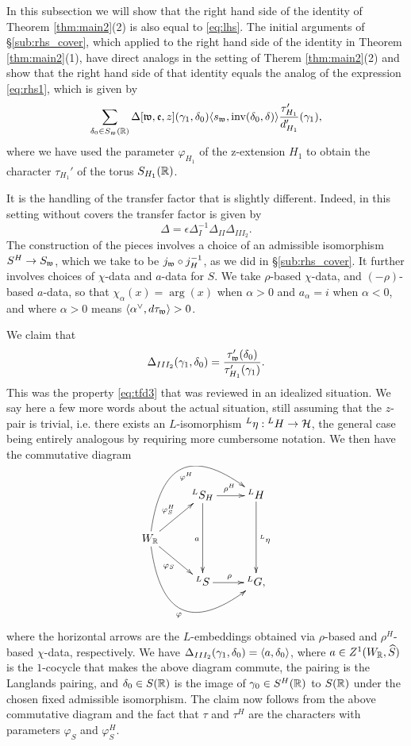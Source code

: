 \documentclass{article}
\theoremstyle{definition}
\numberwithin{equation}{section}
\renewcommand{\-}{\hyp{}}
\begin{document}
In this subsection we will show that the right hand side of the identity of Theorem \ref{thm:main2}(2) is also equal to \eqref{eq:lhs}. The initial arguments of \S\ref{sub:rhs_cover}, which applied to the right hand side of the identity in Theorem \ref{thm:main2}(1), have direct analogs in the setting of Therem \ref{thm:main2}(2) and show that the right hand side of that identity equals the analog of the expression \eqref{eq:rhs1}, which is given by
\begin{equation} \label{eq:rhs2}
\sum_{\delta_0 \in S_{\mathfrak{w}}(\mathbb{R})} \Delta[\mathfrak{w},\mathfrak{e},z](\gamma_1,\delta_0)\langle s_{\mathfrak{w}},\textrm{inv}(\delta_0,\delta)\rangle \frac{\tau'_{H_1}}{d'_{H_1}}(\gamma_1),	
\end{equation}
where we have used the parameter $\varphi_{H_1}$ of the z-extension $H_1$ to obtain the character $\tau_{H_1}'$ of the torus $S_{H_1}(\mathbb{R})$.


It is the handling of the transfer factor that is slightly different. Indeed, in this setting without covers the transfer factor is given by
\[ \Delta = \epsilon\Delta_I^{-1}\Delta_{II}\Delta_{III_2}. \]
The construction of the pieces involves a choice of an admissible isomorphism $S^H \to S_{\mathfrak{w}}$, which we take to be $j_{\mathfrak{w}}\circ j_H^{-1}$, as we did in \S\ref{sub:rhs_cover}. It further involves choices of $\chi$-data and $a$-data for $S$. We take $\rho$-based $\chi$-data, and $(-\rho)$-based $a$-data, so that $\chi_\alpha(x)=\arg(x)$ when $\alpha>0$ and $a_\alpha=i$ when $\alpha<0$, and where $\alpha>0$ means $\langle\alpha^\vee,d\tau_{\mathfrak{w}}\rangle>0$.

We claim that
\[ \Delta_{III_2}(\gamma_1,\delta_0) = \frac{\tau'_{\mathfrak{w}}(\delta_0)}{\tau'_{H_1}(\gamma_1)}.\]
This was the property \eqref{eq:tfd3} that was reviewed in an idealized situation. We say here a few more words about the actual situation, still assuming that the $z$-pair is trivial, i.e. there exists an $L$\-isomorphism $^L\eta : {^LH} \to \mathcal{H}$, the general case being entirely analogous by requiring more cumbersome notation. We then have the commutative diagram
\[ \xymatrix{
	&^LS_H\ar[dd]_a\ar[r]^{\rho^H}&^LH\ar[dd]^{^L\eta}\\
	W_\R\ar[ru]^{\varphi^H_S}\ar@/^4pc/[rru]_-{\varphi^H}\ar[rd]_{\varphi_S}\ar@/_4pc/[rrd]_-{\varphi}\\
	&^LS\ar[r]^{\rho}&^LG,
}
\]
where the horizontal arrows are the $L$\-embeddings obtained via $\rho$-based and $\rho^H$-based $\chi$-data, respectively. We have $\Delta_{III_2}(\gamma_1,\delta_0)=\langle a,\delta_0\rangle$, where $a \in Z^1(W_{\mathbb{R}},\widehat S)$ is the $1$-cocycle that makes the above diagram commute, the pairing is the Langlands pairing, and $\delta_0 \in S(\mathbb{R})$ is the image of $\gamma_0 \in S^H(\mathbb{R})$ to $S(\mathbb{R})$ under the chosen fixed admissible isomorphism. The claim now follows from the above commutative diagram and the fact that $\tau$ and $\tau^H$ are the characters with parameters $\varphi_S$ and $\varphi_S^H$.
\end{document}
